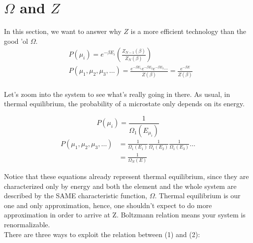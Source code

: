 

\usepackage{multicol}



    \section{$\Omega$ and $Z$}
    \newcommand{\ThE}{thermal equilibrium}
        
        In this section, we want to answer why $Z$ is a more efficient technology than the good 'ol $\Omega$.
        \begin{align*}
            &P(\mu_i) = e^{-\beta E_i}
            \left( \frac{Z_{N-1}(\beta)}{Z_N(\beta)}\right)\\
            &P(\mu_1,\mu_2,\mu_3,\ldots) = \frac{e^{-\beta E_1} e^{-\beta E_2} e^{-\beta E_3} \cdots}{Z(\beta)} = \frac{e^{-\beta E} }{Z(\beta)}\\
        \end{align*}

        Let's zoom into the system to see what's really going in there. As usual, in \ThE, the probability of a microstate only depends on its energy.

            \[P(\mu_i) = \frac1{\Omega_1(E_{\mu_i})} \]
        \begin{align}
            P(\mu_1,\mu_2,\mu_3,\ldots) &= \frac1{\Omega_1(E_1)} \frac1{\Omega_1(E_2)} \frac1{\Omega_1(E_3)} \ldots \\
            &= \frac1{\Omega_N(E)}
        \end{align}

        Notice that these equations already represent thermal equilibrium, since they are characterized only by energy and both the element and the whole system are described by the SAME characteristic function, $\Omega$. Thermal equilibrium is our one and only approximation, hence, one shouldn't expect to do more approximation in order to arrive at Z. Boltzmann relation means your system is renormalizable.\\
        There are three ways to exploit the relation between (1) and (2):
